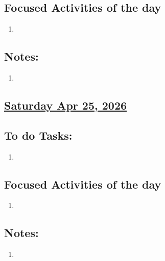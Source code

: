 \subsection*{Focused Activities of the day}
\begin{enumerate}[\ding{212}]  
    \item  
\end{enumerate}
\subsection*{Notes:}
\begin{enumerate}
    \item 
\end{enumerate}
\subsection*{\underline{Saturday Apr 25, 2026} }
\subsection*{To do Tasks:}
\begin{enumerate}
    \item 
\end{enumerate}
\subsection*{Focused Activities of the day}
\begin{enumerate}[\ding{212}]  
    \item 
\end{enumerate}
\subsection*{Notes:}
\begin{enumerate}
    \item 
\end{enumerate}
